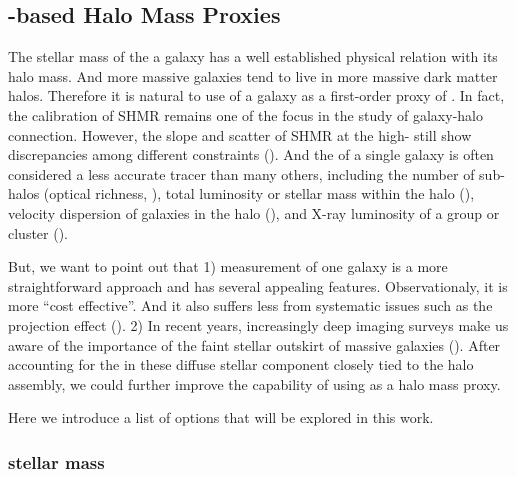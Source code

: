\documentclass[a4paper,fleqn,usenatbib]{mnras}
\begin{document}

\subsection{\mstar{}-based Halo Mass Proxies}
    \label{sec:proxy_mstar}
    
    The stellar mass of the a galaxy has a well established physical relation with its halo mass.
    And more massive galaxies tend to live in more massive dark matter halos.
    Therefore it is natural to use \mstar{} of a galaxy as a first-order proxy of \mvir{}.
    In fact, the calibration of SHMR remains one of the focus in the study of galaxy-halo connection.
    However, the slope and scatter of SHMR at the high-\mstar{} still show discrepancies among 
    different constraints (\addref{}). 
    And the \mstar{} of a single galaxy is often considered a less accurate \mvir{} tracer 
    than many others, including the number of sub-halos (optical richness, \addref{}), 
    total luminosity or stellar mass within the halo (\addref{}), velocity dispersion of galaxies
    in the halo (\addref{}), and X-ray luminosity of a group or cluster (\addref{}). 
    
    But, we want to point out that 
    1) \mstar{} measurement of one galaxy is a more straightforward approach and has several 
    appealing features. Observationaly, it is more ``cost effective''. And it also suffers less
    from systematic issues such as the projection effect (\addref{}).
    2) In recent years, increasingly deep imaging surveys make us aware of the importance of the 
    faint stellar outskirt of massive galaxies (\addref{}). 
    After accounting for the \mstar{} in these diffuse stellar component closely tied to the 
    halo assembly, we could further improve the capability of using \mstar{} as a halo mass proxy.
    
    Here we introduce a list of \mstar{} options that will be explored in this work.

\subsubsection{\cmodel{} stellar mass}
    \label{sec:mcmodel}
    
\end{document}
